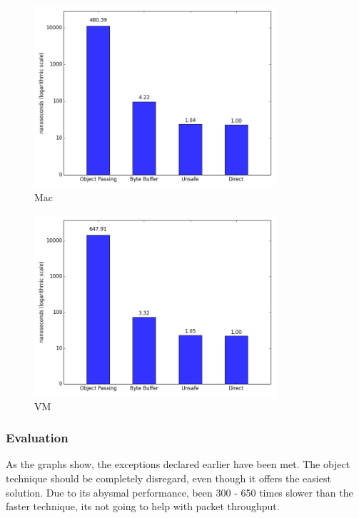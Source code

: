 \documentclass[final_report.tex]{subfiles}
\begin{document}
\begin{figure}[H]
	\centering
	\includegraphics[width=0.8\textwidth]{img/mac.png}
	\caption{Mac}
	\label{fig:layers}
\end{figure}

\begin{figure}[H]
	\centering
	\includegraphics[width=0.8\textwidth]{img/vm.png}
	\caption{VM}
	\label{fig:layers}
\end{figure}


\subsubsection{Evaluation}
As the graphs show, the exceptions declared earlier have been met. The object technique should be completely disregard, even though it offers the easiest solution. Due to its abysmal performance, been 300 - 650 times slower than the faster technique, its not going to help with packet throughput.
\end{document}
